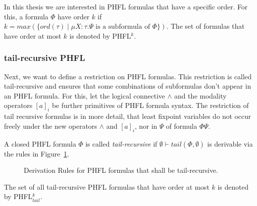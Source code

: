 In this thesis we are interested in PHFL formulas that have a specific order. For this, a formula $\Phi$ have order $k$
if $k = max(\{ord(\tau)\mid \mu X \colon \tau. \Psi \text{ is a subformula of } \Phi\})$. The set of formulas that have
order at most $k$ is denoted by PHFL$^k$.

\subsubsection{tail-recursive PHFL}

Next, we want to define a restriction on PHFL formulas. This restriction is called tail-recursive and ensures that
some combinations of subformulas don't appear in an PHFL formula. For this, let the logical connective
$\wedge$ and the modality operators $[a]_i$ be further primitives of PHFL formula syntax. The restriction of tail
recursive formulas is in more detail, that least fixpoint variables do not occur freely under the new operators
$\wedge$ and $[a]_i$, nor in $\Psi$ of formula $\Phi\Psi$.

\begin{definition}
    A closed PHFL formula $\Phi$ is called \emph{tail-recursive} if $\emptyset \vdash tail(\Phi, \emptyset)$ is
    derivable via the rules in Figure~\ref{figure:phfl-tail-recursive}.
\end{definition}

\begin{figure}
    \caption{Derivation Rules for PHFL formulas that shall be tail-recursive.}
    \label{figure:phfl-tail-recursive}
\end{figure}

The set of all tail-recursive PHFL formulas that have order at most $k$ is denoted by PHFL$^k_{tail}$.